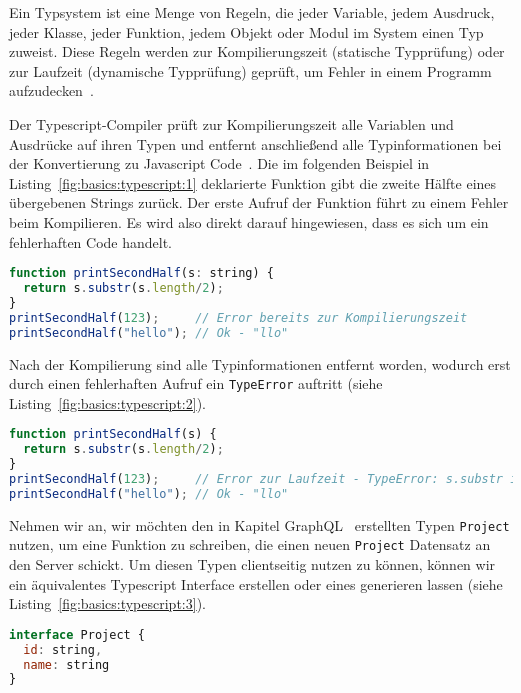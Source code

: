 Ein Typsystem ist eine Menge von Regeln, die jeder Variable, jedem Ausdruck, jeder Klasse,
jeder Funktion, jedem Objekt oder Modul im System einen Typ zuweist.
Diese Regeln werden zur  Kompilierungszeit (statische Typprüfung) oder zur Laufzeit (dynamische Typprüfung) geprüft,
um Fehler in einem Programm aufzudecken~\cite{typescript-typesystem-medium}.

Der Typescript-Compiler prüft zur Kompilierungszeit alle Variablen und Ausdrücke auf ihren Typen und entfernt anschließend alle Typinformationen
bei der Konvertierung zu Javascript Code~\cite{typescript-github-specification}.
Die im folgenden Beispiel in Listing~\ref{fig:basics:typescript:1} deklarierte Funktion gibt die zweite Hälfte eines übergebenen Strings zurück.
Der erste Aufruf der Funktion führt zu einem Fehler beim Kompilieren. Es wird also direkt darauf hingewiesen, dass es sich um ein fehlerhaften Code handelt.


\begin{lstlisting}[language=Javascript,float=h!,caption={Typescript Funktion mit typisiertem Parameter}, label={fig:basics:typescript:1}]
function printSecondHalf(s: string) {
  return s.substr(s.length/2);
}
printSecondHalf(123);     // Error bereits zur Kompilierungszeit
printSecondHalf("hello"); // Ok - "llo"
\end{lstlisting}

Nach der Kompilierung sind alle Typinformationen entfernt worden, wodurch erst durch einen fehlerhaften Aufruf
ein \texttt{TypeError} auftritt (siehe Listing~\ref{fig:basics:typescript:2}).

\begin{lstlisting}[language=Javascript,float=h!,caption={Zu Javascript kompilierte Funktion}, label={fig:basics:typescript:2}]
function printSecondHalf(s) {
  return s.substr(s.length/2);
}
printSecondHalf(123);     // Error zur Laufzeit - TypeError: s.substr is not a function
printSecondHalf("hello"); // Ok - "llo"
\end{lstlisting}

Nehmen wir an, wir möchten den in Kapitel GraphQL~ erstellten Typen \texttt{Project} nutzen,
um eine Funktion zu schreiben, die einen neuen \texttt{Project} Datensatz an den Server schickt. Um diesen Typen clientseitig nutzen zu können,
können wir ein äquivalentes Typescript Interface erstellen oder eines generieren lassen (siehe Listing~\ref{fig:basics:typescript:3}).

\begin{lstlisting}[language=Javascript,float=h!,caption={Typescript Project Interface}, label={fig:basics:typescript:3}]
interface Project {
  id: string,
  name: string
}
\end{lstlisting}


